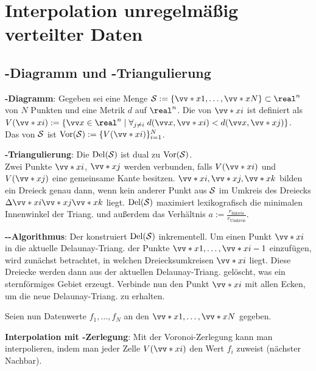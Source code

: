\chapter{%
    Interpolation unregelmäßig verteilter Daten%
}

\section{%
    -Diagramm und -Triangulierung%
}

\textbf{-Diagramm}:
Gegeben sei eine Menge $\S := \{\vecs{x}{1}, \dotsc, \vecs{x}{N}\} \subset \real^n$ von
$N$ Punkten und eine Metrik $d$ auf $\real^n$.
Die  von $\vecs{x}{i}$ ist definiert als\\
$V(\vecs{x}{i}) := \{\vec{x} \in \real^n \;|\;
\forall_{j\not=i}\; d(\vec{x}, \vecs{x}{i}) < d(\vec{x}, \vecs{x}{j})\}$.\\
Das  von $\S$ ist $\Vor(\S) := \{V(\vecs{x}{i})\}_{i=1}^N$.

\textbf{-Triangulierung}:
Die  $\Del(\S)$ ist dual zu $\Vor(\S)$.\\
Zwei Punkte $\vecs{x}{i}$, $\vecs{x}{j}$ werden verbunden, falls
$V(\vecs{x}{i})$ und $V(\vecs{x}{j})$ eine gemeinsame Kante besitzen.
$\vecs{x}{i}, \vecs{x}{j}, \vecs{x}{k}$ bilden ein Dreieck genau dann, wenn
kein anderer Punkt aus $\S$ im Umkreis des Dreiecks
$\Delta\vecs{x}{i}\vecs{x}{j}\vecs{x}{k}$ liegt.
$\Del(\S)$ maximiert lexikografisch die minimalen Innenwinkel der Triang. und außerdem
das Verhältnis $a := \frac{r_\text{Inkreis}}{r_\text{Umkreis}}$.

\textbf{--Algorithmus}:
Der  konstruiert $\Del(\S)$ inkrementell.
Um einen Punkt $\vecs{x}{i}$ in die aktuelle Delaunay-Triang. der Punkte
$\vecs{x}{1}, \dotsc, \vecs{x}{i-1}$ einzufügen,
wird zunächst betrachtet, in welchen Dreiecksumkreisen $\vecs{x}{i}$ liegt.
Diese Dreiecke werden dann aus der aktuellen Delaunay-Triang. gelöscht,
was ein sternförmiges Gebiet erzeugt.
Verbinde nun den Punkt $\vecs{x}{i}$ mit allen Ecken, um die neue Delaunay-Triang. zu erhalten.

\linie

Seien nun Datenwerte $f_1, \dotsc, f_N$ an den $\vecs{x}{1}, \dotsc, \vecs{x}{N}$ gegeben.

\textbf{Interpolation mit -Zerlegung}:
Mit der Voronoi-Zerlegung kann man interpolieren,
indem man jeder Zelle $V(\vecs{x}{i})$ den Wert $f_i$ zuweist
(nächster Nachbar).

